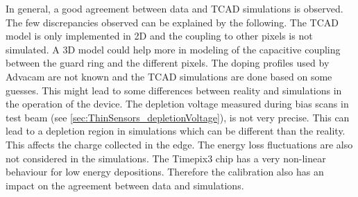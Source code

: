 In general, a good agreement between data and TCAD simulations is
observed. The few discrepancies observed can be explained by the
following. The TCAD model is only implemented in 2D and the coupling
to other pixels is not simulated. A 3D model could help more in
modeling of the capacitive coupling between the guard ring and the
different pixels. The doping profiles used by Advacam are not known
and the TCAD simulations are done based on some guesses. This might
lead to some differences between reality and simulations in the
operation of the device. The depletion voltage measured during bias
scans in test beam (see \cref{sec:ThinSensors_depletionVoltage}), is
not very precise. This can lead to a depletion region in simulations
which can be different than the reality. This affects the charge
collected in the edge. The energy loss fluctuations are also not
considered in the simulations. The Timepix3 chip has a very non-linear
behaviour for low energy depositions. Therefore the calibration also
has an impact on the agreement between data and simulations.









